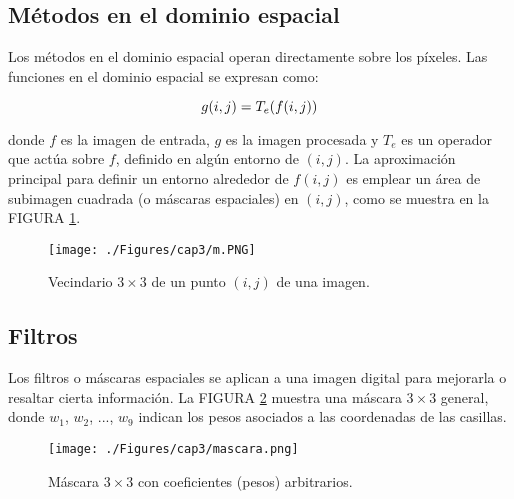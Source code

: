\subsection{Métodos en el dominio espacial}
Los métodos en el dominio espacial operan directamente sobre los píxeles. Las funciones en el dominio espacial se expresan como:
%

%

\begin{equation}
\centering
\label{eq:metDomEsp}
g(i,j)=T_e(f(i,j))
\end{equation}

donde $f$ es la imagen de entrada, $g$ es la imagen procesada y $T_e$ es un operador que actúa sobre $f$, definido en algún entorno de $(i,j)$.
La aproximación principal para definir un entorno alrededor de $f(i,j)$ es emplear un área de subimagen cuadrada (o máscaras espaciales) en $(i,j)$, como se muestra en la FIGURA \ref{fig:metDomEsp}. 

\begin{figure}[H]
	\centering
		\texttt{[image: ./Figures/cap3/m.PNG]}
	\caption{Vecindario $3\times3$ de un punto $(i,j)$ de una imagen.}
	\label{fig:metDomEsp}
\end{figure}

\subsection{Filtros}
Los filtros o máscaras espaciales se aplican a una imagen digital para mejorarla o resaltar cierta información.
La FIGURA \ref{fig:mascara3x3} muestra una máscara $3\times3$ general, donde $w_{1}$, $w_{2}$, ..., $w_{9}$ indican los pesos asociados a las coordenadas de las casillas.


\begin{figure}[H]
	\centering

		\texttt{[image: ./Figures/cap3/mascara.png]}
	\caption{Máscara $3\times3$ con coeficientes (pesos) arbitrarios.}

	\label{fig:mascara3x3}
\end{figure}


